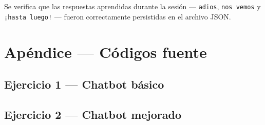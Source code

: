 \documentclass[../Main_Include.tex]{subfiles}
\begin{document}
Se verifica que las respuestas aprendidas durante la sesión ---
\texttt{adios}, \texttt{nos vemos} y \texttt{¡hasta luego!} ---
fueron correctamente persistidas en el archivo JSON.

\newpage
\appendix
\renewcommand{\thesection}{\Alph{section}}
\section*{Apéndice — Códigos fuente}

\subsection*{Ejercicio 1 — Chatbot básico}



\newpage

\subsection*{Ejercicio 2 — Chatbot mejorado}


\end{document}
